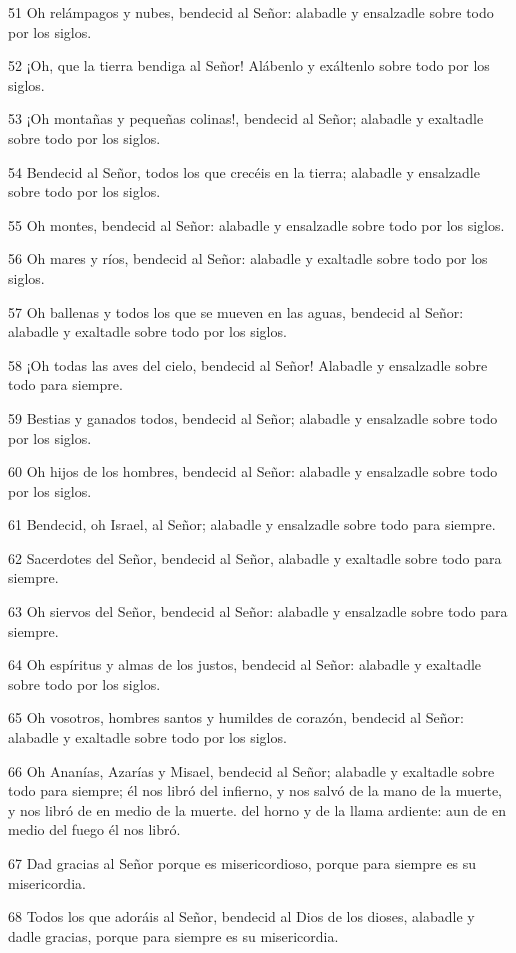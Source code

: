 \par 51 Oh relámpagos y nubes, bendecid al Señor: alabadle y ensalzadle sobre todo por los siglos.
\par 52 ¡Oh, que la tierra bendiga al Señor! Alábenlo y exáltenlo sobre todo por los siglos.
\par 53 ¡Oh montañas y pequeñas colinas!, bendecid al Señor; alabadle y exaltadle sobre todo por los siglos.
\par 54 Bendecid al Señor, todos los que crecéis en la tierra; alabadle y ensalzadle sobre todo por los siglos.
\par 55 Oh montes, bendecid al Señor: alabadle y ensalzadle sobre todo por los siglos.
\par 56 Oh mares y ríos, bendecid al Señor: alabadle y exaltadle sobre todo por los siglos.
\par 57 Oh ballenas y todos los que se mueven en las aguas, bendecid al Señor: alabadle y exaltadle sobre todo por los siglos.
\par 58 ¡Oh todas las aves del cielo, bendecid al Señor! Alabadle y ensalzadle sobre todo para siempre.
\par 59 Bestias y ganados todos, bendecid al Señor; alabadle y ensalzadle sobre todo por los siglos.
\par 60 Oh hijos de los hombres, bendecid al Señor: alabadle y ensalzadle sobre todo por los siglos.
\par 61 Bendecid, oh Israel, al Señor; alabadle y ensalzadle sobre todo para siempre.
\par 62 Sacerdotes del Señor, bendecid al Señor, alabadle y exaltadle sobre todo para siempre.
\par 63 Oh siervos del Señor, bendecid al Señor: alabadle y ensalzadle sobre todo para siempre.
\par 64 Oh espíritus y almas de los justos, bendecid al Señor: alabadle y exaltadle sobre todo por los siglos.
\par 65 Oh vosotros, hombres santos y humildes de corazón, bendecid al Señor: alabadle y exaltadle sobre todo por los siglos.
\par 66 Oh Ananías, Azarías y Misael, bendecid al Señor; alabadle y exaltadle sobre todo para siempre; él nos libró del infierno, y nos salvó de la mano de la muerte, y nos libró de en medio de la muerte. del horno y de la llama ardiente: aun de en medio del fuego él nos libró.
\par 67 Dad gracias al Señor porque es misericordioso, porque para siempre es su misericordia.
\par 68 Todos los que adoráis al Señor, bendecid al Dios de los dioses, alabadle y dadle gracias, porque para siempre es su misericordia.

